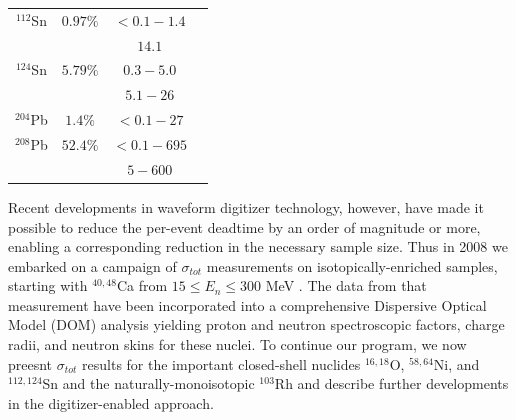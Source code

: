 \documentclass[twocolumn,secnumarabic,amssymb, nobibnotes, aps, prl,
superscriptaddress, nobalancelastpage]{revtex4}
\newcommand{\tots}{\ensuremath{\sigma_{tot}}\,\,}
\begin{document}
\begin{table}[ht]
\begin{center}
\begin{tabular}{ c c c c }
            $^{112}$Sn & $0.97\%$ & $<0.1-1.4$ & \cite{Timokhov1989}\\
            & & $14.1$ & \cite{Dukarevich1967}\\

            $^{124}$Sn & $5.79\%$ & $0.3-5.0$ & \cite{Harper1982}\\
            & & $5.1-26$ & \cite{Rapaport1980}\\

            $^{204}$Pb & $1.4\%$ & $<0.1-27$ & \cite{Carlton2003}\\

            $^{208}$Pb & $52.4\%$ & $<0.1 - 695$ & \cite{Harvey1999}\\
            & & $5-600$ & \cite{Finlay1993}\\

            \hline
        \end{tabular}
    \end{center}
\end{table}

Recent developments in waveform digitizer technology, however, have made it
possible to reduce the per-event deadtime by an order of magnitude or more,
enabling a corresponding reduction in the necessary sample size. Thus in 2008 we
embarked on a campaign of \tots measurements on isotopically-enriched samples,
starting with $^{40,48}$Ca from $15 \leq E_{n} \leq 300$ MeV \cite{Shane2010}.
The data from that measurement have been incorporated into a comprehensive
Dispersive Optical Model (DOM) analysis \cite{Mueller2011, Mahzoon2014,
MahzoonPhDThesis} yielding proton and neutron spectroscopic factors, charge
radii, and neutron skins \cite{Mahzoon2017} for these nuclei. To continue our
program, we now preesnt \tots results for the important closed-shell nuclides
$^{16,18}$O, $^{58,64}$Ni, and $^{112,124}$Sn and the naturally-monoisotopic
$^{103}$Rh and describe further developments in the digitizer-enabled
approach.
\end{document}
